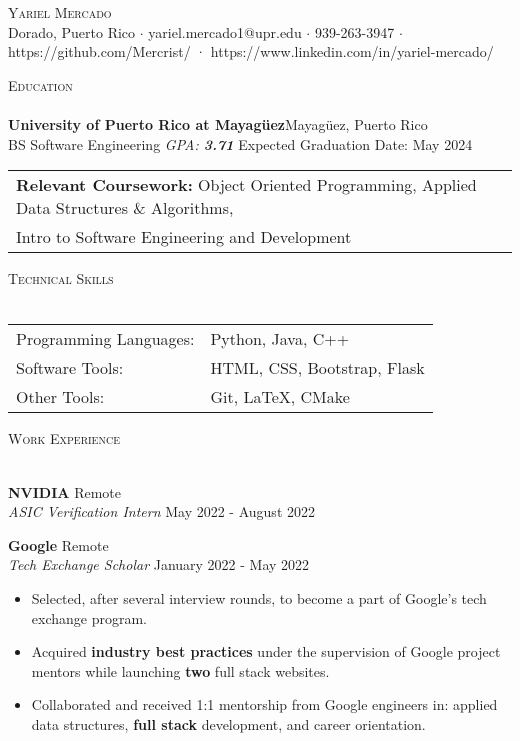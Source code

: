 \documentclass[a4paper]{article}
\newcommand{\lineunder} {
    \vspace*{-8pt} \\
    \hspace*{-18pt} \hrulefill \\
}
\newcommand{\header} [1] {
    {\hspace*{-18pt}\vspace*{6pt} \textsc{#1}}
    \vspace*{-6pt} \lineunder
}
\begin{document}
\vspace*{-40pt}

    

\vspace*{-10pt}
\begin{center}
	{\Huge \scshape {Yariel Mercado}}\\
	Dorado, Puerto Rico $\cdot$ yariel.mercado1@upr.edu $\cdot$ 939-263-3947 $\cdot$ https://github.com/Mercrist/ · https://www.linkedin.com/in/yariel-mercado/\\
\end{center}

\header{Education}
\textbf{University of Puerto Rico at Mayagüez}\hfill Mayagüez, Puerto Rico\\
BS Software Engineering \textit{GPA: \bf{3.71}} \hfill Expected Graduation Date: May 2024\\	

\vspace{2mm}
\begin{tabular}{ l l }
	\textbf{Relevant Coursework:} Object Oriented 	                    				Programming, Applied Data Structures \& Algorithms, \\ Intro to Software Engineering and Development 
\vspace{2mm}
\end{tabular}

\header{Technical Skills}
\begin{tabular}{ l l }
	Programming Languages:       & Python, Java, C++                \\
	Software Tools: & HTML, CSS, Bootstrap, Flask \\
	Other Tools:   & Git, \LaTeX{}, CMake  \\
	
\end{tabular}
\vspace{2mm}

\header{Work Experience}
\vspace{-1mm}

\textbf{NVIDIA} \hfill Remote\\
\textit{ASIC Verification Intern} \hfill May 2022 - August 2022\\
\vspace{2mm}

\textbf{Google} \hfill Remote\\
\textit{Tech Exchange Scholar} \hfill January 2022 - May 2022\\
\vspace{-2mm}
\begin{itemize} \itemsep -1pt
	\item Selected, after several interview rounds, to become a part of Google's tech exchange program. 
	\item Acquired \textbf{industry best practices} under the supervision of Google project mentors while launching \textbf{two} full stack websites.
	\item Collaborated and received 1:1 mentorship from Google engineers in: applied data structures, \textbf{full stack} development, and career orientation.
\end{itemize}
\end{document}
